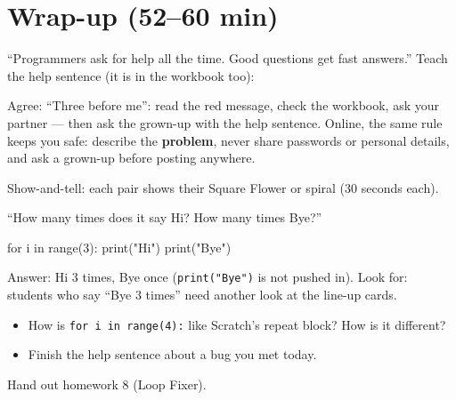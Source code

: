 \section{Wrap-up (52--60 min)}
\begin{safety}
\enquote{Programmers ask for help all the time. Good questions get fast answers.} Teach the help sentence (it is in the workbook too):
Agree: \enquote{Three before me}: read the red message, check the workbook, ask your partner --- then ask the grown-up with the help sentence. Online, the same rule keeps you safe: describe the \textbf{problem}, never share passwords or personal details, and ask a grown-up before posting anywhere.
\end{safety}
Show-and-tell: each pair shows their Square Flower or spiral (30 seconds each).
\begin{formativecheck}
\enquote{How many times does it say Hi? How many times Bye?}
\begin{pycode}
for i in range(3):
    print("Hi")
print("Bye")
\end{pycode}
Answer: Hi 3 times, Bye once (\texttt{print("Bye")} is not pushed in). Look for: students who say \enquote{Bye 3 times} need another look at the line-up cards.
\end{formativecheck}
\begin{reflection}
\begin{itemize}[leftmargin=1.2em,itemsep=1pt]
  \item How is \texttt{for i in range(4):} like Scratch's repeat block? How is it different?
  \item Finish the help sentence about a bug you met today.
\end{itemize}
Hand out homework 8 (Loop Fixer).
\end{reflection}

